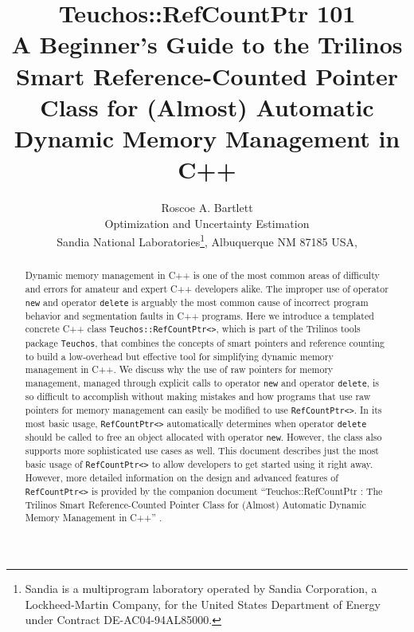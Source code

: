 \documentclass[pdf,ps2pdf,11pt]{SANDreport}
\title{\center
{\Huge\bf Teuchos::RefCountPtr 101}\\[1.5ex]
A Beginner's Guide to the Trilinos Smart Reference-Counted Pointer
Class for (Almost) Automatic Dynamic Memory Management in C++
}
\author{
Roscoe A. Bartlett \\ Optimization and Uncertainty Estimation \\
Sandia National Laboratories\footnote{
Sandia is a multiprogram laboratory operated by Sandia Corporation, a
Lockheed-Martin Company, for the United States Department of Energy
under Contract DE-AC04-94AL85000.}, Albuquerque NM 87185 USA, \\
}
\date{}
\begin{document}
\maketitle

%

%
\begin{abstract}
%
Dynamic memory management in C++ is one of the most common areas of
difficulty and errors for amateur and expert C++ developers alike.
The improper use of operator {}\texttt{new} and operator
{}\texttt{delete} is arguably the most common cause of incorrect
program behavior and segmentation faults in C++ programs.  Here we
introduce a templated concrete C++ class
{}\texttt{Teuchos\-::Ref\-Count\-Ptr<>}, which is part of the Trilinos
tools package {}\texttt{Teuchos}, that combines the concepts of smart
pointers and reference counting to build a low-overhead but effective
tool for simplifying dynamic memory management in C++.  We discuss why
the use of raw pointers for memory management, managed through
explicit calls to operator {}\texttt{new} and operator
{}\texttt{delete}, is so difficult to accomplish without making
mistakes and how programs that use raw pointers for memory management
can easily be modified to use {}\texttt{Ref\-Count\-Ptr<>}.  In its
most basic usage, {}\texttt{Ref\-Count\-Ptr<>} automatically
determines when operator {}\texttt{delete} should be called to free an
object allocated with operator {}\texttt{new}.  However, the class
also supports more sophisticated use cases as well.  This document
describes just the most basic usage of {}\texttt{Ref\-Count\-Ptr<>} to
allow developers to get started using it right away.  However, more
detailed information on the design and advanced features of
{}\texttt{Ref\-Count\-Ptr<>} is provided by the companion document
``Teuchos::RefCountPtr : The Trilinos Smart Reference-Counted Pointer
Class for (Almost) Automatic Dynamic Memory Management in C++''
{}\cite{ref:RefCountPtr}.
%
\end{abstract}
%

%
\clearpage
\end{document}
